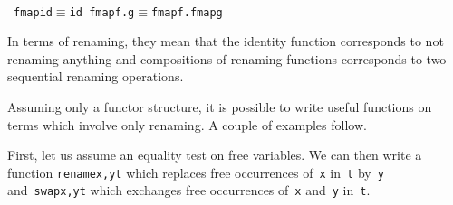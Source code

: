 \documentclass[9pt,authoryear]{sigplanconf}
\begin{document}
%
%
%
~\\~\vphantom{$\{$}\texttt{fmap}\texttt{\mbox{\hspace{0.50em}}}\texttt{id}\texttt{\mbox{\hspace{0.50em}}}\texttt{$ \equiv $}\texttt{\mbox{\hspace{0.50em}}}\texttt{id}\texttt{{\nopagebreak \newline%
}\vphantom{$\{$}}\texttt{fmap}\texttt{\mbox{\hspace{0.50em}}}\texttt{\makebox[1.22ex][l]{$ {(} $}}\texttt{f}\texttt{\mbox{\hspace{0.50em}}}\texttt{.}\texttt{\mbox{\hspace{0.50em}}}\texttt{g}\texttt{\makebox[1.22ex][r]{$ {)} $}}\texttt{\mbox{\hspace{0.50em}}}\texttt{$ \equiv $}\texttt{\mbox{\hspace{0.50em}}}\texttt{fmap}\texttt{\mbox{\hspace{0.50em}}}\texttt{f}\texttt{\mbox{\hspace{0.50em}}}\texttt{.}\texttt{\mbox{\hspace{0.50em}}}\texttt{fmap}\texttt{\mbox{\hspace{0.50em}}}\texttt{g}\texttt{{\nopagebreak \newline%
}\vphantom{$\{$}}%


%
%


%
In terms of renaming, they mean that the identity function corresponds
    to not renaming anything
    and compositions of renaming functions corresponds to two sequential
    renaming operations.%


%
Assuming only a functor structure, it is possible to write useful
    functions on terms which involve only renaming. A couple of examples
    follow.%


%
First, let us assume an equality test on free variables. 
    We can then write a function
    \texttt{rename}\texttt{\mbox{\hspace{0.50em}}}\texttt{\makebox[1.22ex][l]{$ {(} $}}\texttt{x,y}\texttt{\makebox[1.22ex][r]{$ {)} $}}\texttt{\mbox{\hspace{0.50em}}}\texttt{t} which replaces free occurrences of{~}\texttt{x} in{~}\texttt{t}    by{~}\texttt{y} and{~}\texttt{swap}\texttt{\mbox{\hspace{0.50em}}}\texttt{\makebox[1.22ex][l]{$ {(} $}}\texttt{x,y}\texttt{\makebox[1.22ex][r]{$ {)} $}}\texttt{\mbox{\hspace{0.50em}}}\texttt{t} which exchanges free occurrences
    of{~}\texttt{x} and{~}\texttt{y} in{~}\texttt{t}.%
\end{document}
